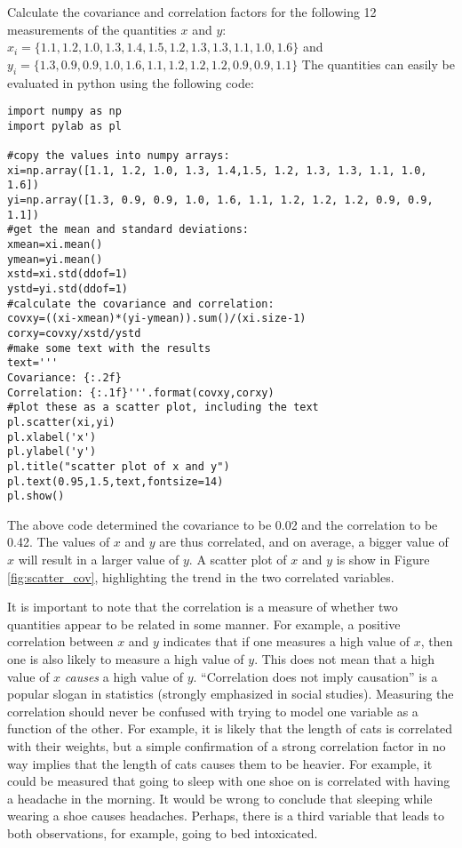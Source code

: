 \begin{example}{}{Calculate the covariance and correlation factors for the following 12 measurements of the quantities $x$ and $y$: $x_i=\{1.1, 1.2, 1.0, 1.3, 1.4,1.5, 1.2, 1.3, 1.3, 1.1, 1.0, 1.6\}$ and $y_i=\{1.3, 0.9, 0.9, 1.0, 1.6, 1.1, 1.2, 1.2, 1.2, 0.9, 0.9, 1.1\}$}{}
\label{ex:covariance}
The quantities can easily be evaluated in python using the following code:
\begin{lstlisting}[frame=single] 
import numpy as np
import pylab as pl

#copy the values into numpy arrays:
xi=np.array([1.1, 1.2, 1.0, 1.3, 1.4,1.5, 1.2, 1.3, 1.3, 1.1, 1.0, 1.6])
yi=np.array([1.3, 0.9, 0.9, 1.0, 1.6, 1.1, 1.2, 1.2, 1.2, 0.9, 0.9, 1.1])
#get the mean and standard deviations:
xmean=xi.mean()
ymean=yi.mean()
xstd=xi.std(ddof=1)
ystd=yi.std(ddof=1)
#calculate the covariance and correlation:
covxy=((xi-xmean)*(yi-ymean)).sum()/(xi.size-1)
corxy=covxy/xstd/ystd
#make some text with the results
text='''
Covariance: {:.2f}
Correlation: {:.1f}'''.format(covxy,corxy)
#plot these as a scatter plot, including the text
pl.scatter(xi,yi)
pl.xlabel('x')
pl.ylabel('y')
pl.title("scatter plot of x and y")
pl.text(0.95,1.5,text,fontsize=14)
pl.show()
\end{lstlisting}
The above code determined the covariance to be 0.02 and the correlation to be 0.42. The values of $x$ and $y$ are thus correlated, and on average, a bigger value of $x$ will result in a larger value of $y$. A scatter plot of $x$ and $y$ is show in Figure \ref{fig:scatter_cov}, highlighting the trend in the two correlated variables.


\end{example}

It is important to note that the correlation is a measure of whether two quantities appear to be related in some manner. For example, a positive correlation between $x$ and $y$ indicates that if one measures a high value of $x$, then one is also likely to measure a high value of $y$. This does not mean that a high value of $x$ \textit{causes} a high value of $y$. ``Correlation does not imply causation'' is a popular slogan in statistics (strongly emphasized in social studies). Measuring the correlation should never be confused with trying to model one variable as a function of the other. For example, it is likely that the length of cats is correlated with their weights, but a simple confirmation of a strong correlation factor in no way implies that the length of cats causes them to be heavier. For example, it could be measured that going to sleep with one shoe on is correlated with having a headache in the morning. It would be wrong to conclude that sleeping while wearing a shoe causes headaches. Perhaps, there is a third variable that leads to both observations, for example, going to bed intoxicated. 


